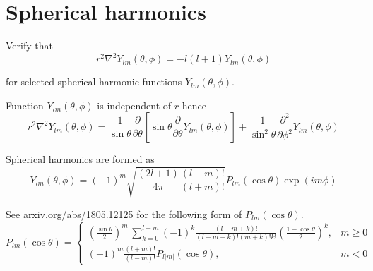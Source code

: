 

\section*{Spherical harmonics}

Verify that
\begin{equation*}
r^2\nabla^2Y_{lm}(\theta,\phi)=-l(l+1)Y_{lm}(\theta,\phi)
\tag{1}
\end{equation*}

for selected spherical harmonic functions $Y_{lm}(\theta,\phi)$.

\bigskip
Function $Y_{lm}(\theta,\phi)$ is independent of $r$ hence
\begin{equation*}
r^2\nabla^2Y_{lm}(\theta,\phi)=\frac{1}{\sin\theta}\frac{\partial}{\partial\theta}
\left[\sin\theta\frac{\partial}{\partial\theta}Y_{lm}(\theta,\phi)\right]
+\frac{1}{\sin^2\theta}\frac{\partial^2}{\partial\phi^2}Y_{lm}(\theta,\phi)
\end{equation*}

Spherical harmonics are formed as
\begin{equation*}
Y_{lm}(\theta,\phi)=(-1)^m\sqrt{\frac{(2l+1)}{4\pi}\frac{(l-m)!}{(l+m)!}}
P_{lm}(\cos\theta)\exp(im\phi)
\end{equation*}

See arxiv.org/abs/1805.12125 for the following form of $P_{lm}(\cos\theta)$.
\begin{equation*}
P_{lm}(\cos\theta)=\begin{cases}\displaystyle
\left(\frac{\sin\theta}{2}\right)^m\,\sum_{k=0}^{l-m}
(-1)^k\frac{(l+m+k)!}{(l-m-k)!(m+k)!k!}
\left(\frac{1-\cos\theta}{2}\right)^k, & m\ge0
\\[4ex]
\displaystyle(-1)^m\frac{(l+m)!}{(l-m)!}P_{l|m|}(\cos\theta), & m<0
\end{cases}
\end{equation*}


